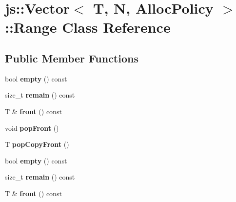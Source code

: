 \hypertarget{classjs_1_1_vector_1_1_range}{\section{js\-:\-:Vector$<$ T, N, Alloc\-Policy $>$\-:\-:Range Class Reference}
\label{classjs_1_1_vector_1_1_range}
}
\subsection*{Public Member Functions}
\begin{DoxyCompactItemize}
\item 
\hypertarget{classjs_1_1_vector_1_1_range_a6a771a96ef88798cb9ae856911bee59b}{bool {\bfseries empty} () const }\label{classjs_1_1_vector_1_1_range_a6a771a96ef88798cb9ae856911bee59b}

\item 
\hypertarget{classjs_1_1_vector_1_1_range_a846357cea23a644ae52708dc8e5a6eaf}{size\-\_\-t {\bfseries remain} () const }\label{classjs_1_1_vector_1_1_range_a846357cea23a644ae52708dc8e5a6eaf}

\item 
\hypertarget{classjs_1_1_vector_1_1_range_a454c43adb5ea720c91c6e53a28eb58d0}{T \& {\bfseries front} () const }\label{classjs_1_1_vector_1_1_range_a454c43adb5ea720c91c6e53a28eb58d0}

\item 
\hypertarget{classjs_1_1_vector_1_1_range_a4bd00bc22c6debfd42f2ada0f85ea799}{void {\bfseries pop\-Front} ()}\label{classjs_1_1_vector_1_1_range_a4bd00bc22c6debfd42f2ada0f85ea799}

\item 
\hypertarget{classjs_1_1_vector_1_1_range_a516769ac09952bb801391b91ba4a7c65}{T {\bfseries pop\-Copy\-Front} ()}\label{classjs_1_1_vector_1_1_range_a516769ac09952bb801391b91ba4a7c65}

\item 
\hypertarget{classjs_1_1_vector_1_1_range_a6a771a96ef88798cb9ae856911bee59b}{bool {\bfseries empty} () const }\label{classjs_1_1_vector_1_1_range_a6a771a96ef88798cb9ae856911bee59b}

\item 
\hypertarget{classjs_1_1_vector_1_1_range_a846357cea23a644ae52708dc8e5a6eaf}{size\-\_\-t {\bfseries remain} () const }\label{classjs_1_1_vector_1_1_range_a846357cea23a644ae52708dc8e5a6eaf}

\item 
\hypertarget{classjs_1_1_vector_1_1_range_a454c43adb5ea720c91c6e53a28eb58d0}{T \& {\bfseries front} () const }\label{classjs_1_1_vector_1_1_range_a454c43adb5ea720c91c6e53a28eb58d0}


\end{DoxyCompactItemize}
